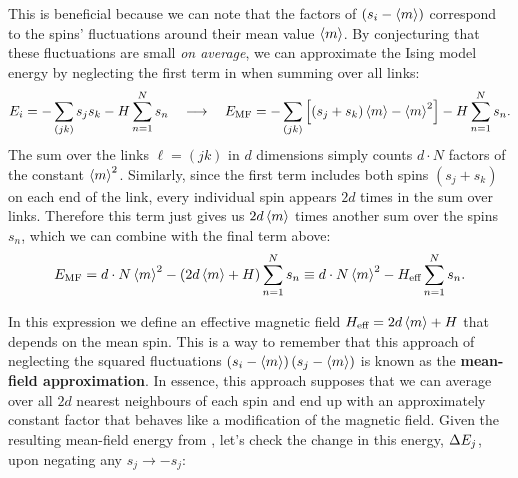 This is beneficial because we can note that the factors of $\left(s_i - \left\langle m \right\rangle\right)$ correspond to the spins' fluctuations around their mean value $\left\langle m \right\rangle$.
By conjecturing that these fluctuations are small \textit{on average}, we can approximate the Ising model energy by neglecting the first term in  when summing over all links:
\begin{equation*}
  E_i = -\sum_{(jk)} s_j s_k - H \sum_{n = 1}^N s_n \quad \longrightarrow \quad E_{\text{MF}} = -\sum_{(jk)} \left[\left(s_j + s_k\right)\left\langle m \right\rangle - \left\langle m \right\rangle^2\right] - H \sum_{n = 1}^N s_n.
\end{equation*}
The sum over the links $\ell = (jk)$ in $d$ dimensions simply counts $d\cdot N$ factors of the constant $\left\langle m \right\rangle^2$.
Similarly, since the first term includes both spins $\left(s_j + s_k\right)$ on each end of the link, every individual spin appears $2d$ times in the sum over links.
Therefore this term just gives us $2d\left\langle m \right\rangle$ times another sum over the spins $s_n$, which we can combine with the final term above:
\begin{equation}
  \label{eq:MF_energy}
  E_{\text{MF}} = d\cdot N \left\langle m \right\rangle^2 - \left(2d\left\langle m \right\rangle + H\right) \sum_{n = 1}^N s_n \equiv d\cdot N \left\langle m \right\rangle^2 - H_{\text{eff}} \sum_{n = 1}^N s_n.
\end{equation}

In this expression we define an effective magnetic field $H_{\text{eff}} = 2d\left\langle m \right\rangle + H$ that depends on the mean spin.
This is a way to remember that this approach of neglecting the squared fluctuations $\left(s_i - \left\langle m \right\rangle\right) \left(s_j - \left\langle m \right\rangle\right)$ is known as the \textbf{mean-field approximation}.
In essence, this approach supposes that we can average over all $2d$ nearest neighbours of each spin and end up with an approximately constant factor that behaves like a modification of the magnetic field. %
Given the resulting mean-field energy \EMF from , let's check the change in this energy, $\Delta E_j$, upon negating any $s_j \to -s_j$:
\begin{mdframed}
  \ \\[120 pt]
\end{mdframed}

